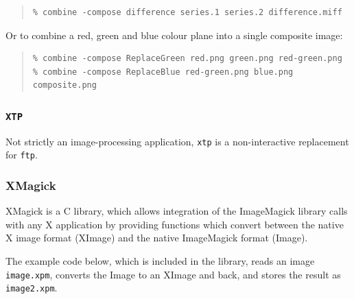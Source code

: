 \documentclass[twoside,11pt]{article}
\newcommand{\htmladdnormallink}[2]{#1}
\begin{document}
\small
\begin{quote}
\begin{verbatim}
% combine -compose difference series.1 series.2 difference.miff
\end{verbatim}
\end{quote}
\normalsize

Or to combine a red, green and blue colour plane into a single composite image:

\small
\begin{quote}
\begin{verbatim}
% combine -compose ReplaceGreen red.png green.png red-green.png
% combine -compose ReplaceBlue red-green.png blue.png composite.png
\end{verbatim}
\end{quote}
\normalsize

\subsubsection{{\tt XTP}}

Not strictly an image-processing application, {\tt xtp} is a
non-interactive replacement for {\tt ftp}.

\subsubsection{XMagick}

\htmladdnormallink{XMagick}{http://siag.nu/xmagick/} is a C library,
which allows integration of the ImageMagick library calls with any X
application by providing functions which convert between the native X
image format (XImage) and the native ImageMagick format (Image).

The example code below, which is included in the library, reads an
image {\tt image.xpm}, converts the Image to an XImage and back, and
stores the result as {\tt image2.xpm}.
\end{document}
